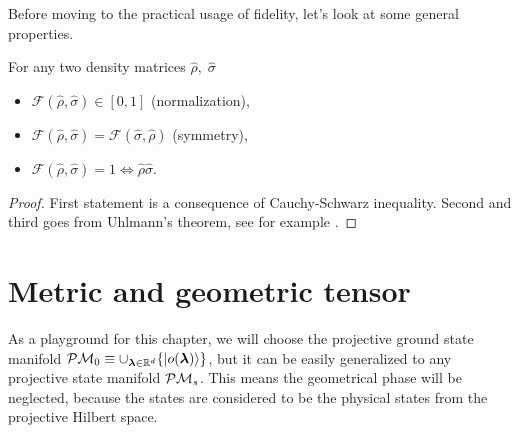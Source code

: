 Before moving to the practical usage of fidelity, let's look at some general properties.
    

\begin{thm}
    For any two density matrices $\hat\rho,\;\hat\sigma$
    \begin{itemize}
        \item $\mathcal F(\hat\rho,\hat\sigma)\in[0,1]$ (normalization),
        \item $\mathcal F(\hat\rho,\hat\sigma) = \mathcal F(\hat\sigma,\hat\rho)$ (symmetry),
        \item $\mathcal F(\hat\rho,\hat\sigma)=1 \Leftrightarrow \hat\rho\hat\sigma$.
    \end{itemize}
\end{thm}
\begin{proof}
    First statement is a consequence of Cauchy-Schwarz inequality. Second and third goes from Uhlmann's theorem, see for example \cite{uhlman}.
\end{proof}



\section{Metric and geometric tensor}
As a playground for this chapter, we will choose the projective ground state manifold $\mathcal{P}\mathcal{M}_0\equiv \cup_{{\bm\lambda}\in\mathbb{R}^d} \{\ket{o({\bm\lambda})}\}$, but it can be easily generalized to any projective state manifold $\mathcal{P}\mathcal{M}_s$. This means the geometrical phase will be neglected, because the states are considered to be the physical states from the projective Hilbert space.

